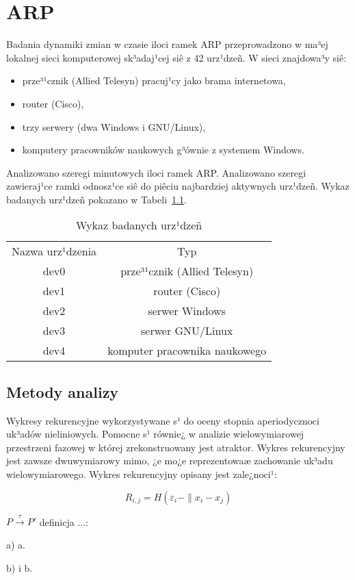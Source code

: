 \chapter{ARP}
Badania dynamiki zmian w czasie iloci ramek ARP przeprowadzono w ma³ej lokalnej sieci komputerowej sk³adaj¹cej siê z 42 urz¹dzeñ. W sieci znajdowa³y siê:
\begin{itemize}
    \item prze³¹cznik (Allied Telesyn) pracuj¹cy jako brama internetowa, 
    \item router (Cisco),
    \item trzy serwery (dwa Windows i GNU/Linux),
    \item komputery pracowników naukowych g³ównie z systemem Windows.
\end{itemize}
Analizowano szeregi minutowych iloci ramek ARP. Analizowano szeregi zawieraj¹ce ramki odnosz¹ce siê do piêciu najbardziej aktywnych urz¹dzeñ. Wykaz badanych urz¹dzeñ pokazano w Tabeli~\ref{tab:Wbu}.

\begin{table}[t]
\centering
\begin{tabular}{|c|c|}
\cline{1-2}
Nazwa urz¹dzenia & Typ\\
\cline{1-2}
dev0	& prze³¹cznik (Allied Telesyn)\\\cline{1-2}
dev1	& router (Cisco)\\\cline{1-2}
dev2	& serwer Windows\\\cline{1-2}
dev3	& serwer GNU/Linux\\\cline{1-2}
dev4	& komputer pracownika naukowego\\\cline{1-2}
\end{tabular}
\caption{Wykaz badanych urz¹dzeñ}
\label{tab:Wbu}
\end{table}

\section{Metody analizy}
Wykresy rekurencyjne wykorzystywane s¹ do oceny stopnia aperiodycznoci uk³adów nieliniowych. Pomocne s¹ równie¿ w analizie wielowymiarowej przestrzeni fazowej w której zrekonstruowany jest atraktor. Wykres rekurencyjny jest zawsze dwuwymiarowy mimo, ¿e mo¿e reprezentowaæ zachowanie uk³adu wielowymiarowego. Wykres rekurencyjny opisany jest zale¿noci¹:

\begin{equation}
    R_{i,j}= H(\varepsilon_i-\|x_i-x_j)
\end{equation}

\begin{defi}
$P\stackrel{\tau}{\rightarrow}P'$ definicja ...:
\begin{list}{}{}
    \item[a)] a.
    \item[b)] i b.
\end{list}
\label{nazwa}
\end{defi}

